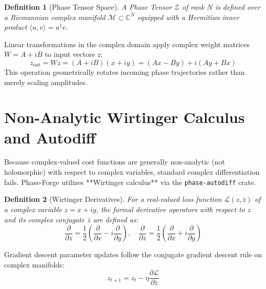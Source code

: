 \documentclass[11pt,a4paper]{article}
\newtheorem{definition}{Definition}
\begin{document}
\begin{definition}[Phase Tensor Space]
A Phase Tensor $\mathcal{Z}$ of rank $N$ is defined over a Riemannian complex manifold $\mathcal{M} \subset \mathbb{C}^N$ equipped with a Hermitian inner product $\langle u, v \rangle = u^\dagger v$.
\end{definition}

Linear transformations in the complex domain apply complex weight matrices $W = A + iB$ to input vectors $z$:
\begin{equation}
z_{\text{out}} = W z = (A + iB)(x + iy) = (Ax - By) + i(Ay + Bx)
\end{equation}
This operation geometrically rotates incoming phase trajectories rather than merely scaling amplitudes.

\section{Non-Analytic Wirtinger Calculus and Autodiff}
Because complex-valued cost functions are generally non-analytic (not holomorphic) with respect to complex variables, standard complex differentiation fails. Phase-Forge utilizes **Wirtinger calculus** via the \texttt{phase-autodiff} crate. 

\begin{definition}[Wirtinger Derivatives]
For a real-valued loss function $\mathcal{L}(z, \bar{z})$ of a complex variable $z = x + iy$, the formal derivative operators with respect to $z$ and its complex conjugate $\bar{z}$ are defined as:
\begin{equation}
\frac{\partial}{\partial z} = \frac{1}{2} \left( \frac{\partial}{\partial x} - i \frac{\partial}{\partial y} \right), \quad \frac{\partial}{\partial \bar{z}} = \frac{1}{2} \left( \frac{\partial}{\partial x} + i \frac{\partial}{\partial y} \right)
\end{equation}
\end{definition}

Gradient descent parameter updates follow the conjugate gradient descent rule on complex manifolds:
\begin{equation}
z_{t+1} = z_t - \eta \frac{\partial \mathcal{L}}{\partial \bar{z}}
\end{equation}
\end{document}
